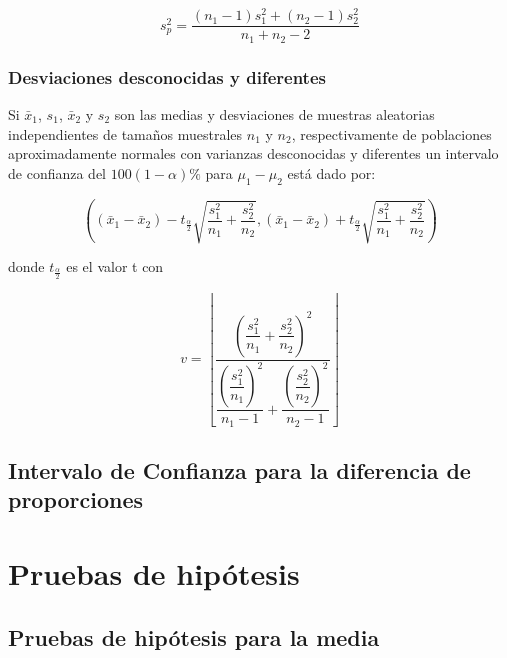 \documentclass[]{book}
\begin{document}
\begin{equation} 
s_p^2 = \dfrac{\left(n_1 - 1 \right)s_1^2+\left(n_2 - 1 \right)s_2^2}{n_1 +n_2 -2} 
\label{eq:sp}
\end{equation}

\subsubsection{Desviaciones desconocidas y
diferentes}\label{desviaciones-desconocidas-y-diferentes}

Si \(\bar{x}_1\), \(s_1\), \(\bar{x}_2\) y \(s_2\) son las medias y
desviaciones de muestras aleatorias independientes de tamaños muestrales
\(n_1\) y \(n_2\), respectivamente de poblaciones aproximadamente
normales con varianzas desconocidas y diferentes un intervalo de
confianza del \(100\left(1-\alpha \right)\%\) para \(\mu_1 - \mu_2\)
está dado por:

\begin{equation} 
\left( \left( \bar{x}_1 - \bar{x}_2 \right) - t_{\frac{\alpha}{2}}\sqrt{\dfrac{s_1^2}{n_1} + \dfrac{s_2^2}{n_2}} , \left( \bar{x}_1 - \bar{x}_2 \right) + t_{\frac{\alpha}{2}}\sqrt{\dfrac{s_1^2}{n_1} + \dfrac{s_2^2}{n_2}} \right) 
\label{eq:ic2msdd}
\end{equation}

donde \(t_{\frac{\alpha}{2}}\) es el valor t con

\begin{equation} 
v = \left\lfloor\dfrac{\left(\dfrac{s_1^2}{n_1} + \dfrac{s_2^2}{n_2} \right)^2}{\dfrac{\left( \dfrac{s_1^2}{n_1} \right)^2}{n_1-1}+\dfrac{\left( \dfrac{s_2^2}{n_2} \right)^2}{n_2-1}}\right\rfloor
\label{eq:dfsdd}
\end{equation}

\subsection{Intervalo de Confianza para la diferencia de
proporciones}\label{intervalo-de-confianza-para-la-diferencia-de-proporciones}

\section{Pruebas de hipótesis}\label{ph}

\subsection{Pruebas de hipótesis para la
media}\label{pruebas-de-hipotesis-para-la-media}
\end{document}
